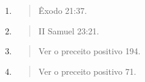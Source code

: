 \begin{enumerate}
\def\labelenumi{\arabic{enumi}.}
\setcounter{enumi}{402}
\item
  \begin{quote}
  Êxodo 21:37.
  \end{quote}
\item
  \begin{quote}
  II Samuel 23:21.
  \end{quote}
\item
  \begin{quote}
  Ver o preceito positivo 194.
  \end{quote}
\item
  \begin{quote}
  Ver o preceito positivo 71.
  \end{quote}
\end{enumerate}

